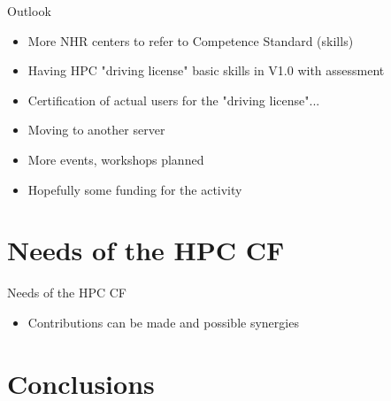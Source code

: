 \documentclass[compress,aspectratio=169]{beamer}
\begin{document}
\begin{frame}{Outlook}
\begin{itemize}
  \item More NHR centers to refer to Competence Standard (skills)
  \item Having HPC "driving license" basic skills in V1.0 with assessment
  \item Certification of actual users for the "driving license"...
  \item Moving to another server
  \item More events, workshops planned
  \item Hopefully some funding for the activity
\end{itemize}
\end{frame}

\section{Needs of the HPC CF}
\sectionIntroHidden

\begin{frame}{Needs of the HPC CF}
\begin{itemize}
  \item Contributions can be made and possible synergies
\end{itemize}
\end{frame}

\section{Conclusions}
\sectionIntroHidden
\end{document}
